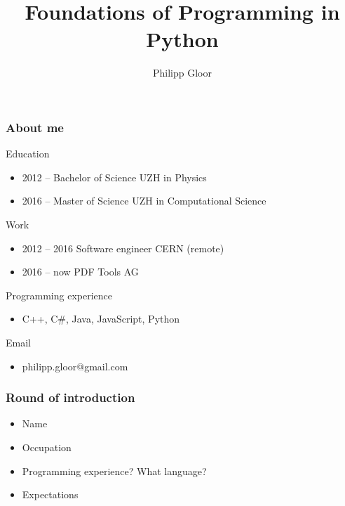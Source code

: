 \documentclass[10pt, a4paper]{beamer} %
\title[Crisis] %
{Foundations of Programming in Python}
\author %
{Philipp Gloor\inst{1}}
\institute
{
  \inst{1}%
  University of Zurich
}
\date{}
\begin{document}
\begin{frame}
\titlepage
\end{frame}

\begin{frame}
\frametitle{About me}

\begin{block}{Education}
    \begin{itemize}
        \item 2012 -- Bachelor of Science UZH in Physics
        \item 2016 -- Master of Science UZH in Computational Science
    \end{itemize}
\end{block}

\begin{block}{Work}
    \begin{itemize}
        \item 2012 -- 2016 Software engineer CERN (remote)
        \item 2016 -- now PDF Tools AG
    \end{itemize}
\end{block}

\begin{block}{Programming experience}
    \begin{itemize}
        \item[] C++, C\#, Java, JavaScript, Python
    \end{itemize}
\end{block}

\begin{block}{Email}
\begin{itemize}
    \item[] philipp.gloor@gmail.com
\end{itemize}
    
\end{block}
 
 
 
 
\end{frame}
\begin{frame}[t]\frametitle{Round of introduction}
    \begin{itemize}
        \item Name
        \item Occupation
        \item Programming experience? What language?
        \item Expectations
    \end{itemize}
\end{frame}
\end{document}
